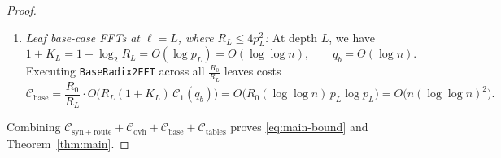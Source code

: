 \begin{proof}
\begin{itemize}[leftmargin=*]
\begin{enumerate}[label=(\alph*)]
    \[
      \frac{R_0}{R_\ell} \cdot O\!\left(\frac{R_\ell}{\tilde{W}_\ell} \cdot \tilde{W}_\ell p_{\ell+1} \log(\tilde{W}_\ell p_{\ell+1})\right) = O(R_0 p_{\ell+1} \log p_{\ell+1}) = O(n \log \log n)
    \]
    steps. Likewise, the $2 R_\ell$ pre-twists and post-twists and the at most $3 R_\ell$ real-by-complex solver products per node each multiply $O(p_{\ell+1})$-bit integers via $\texttt{Multiply}_1$ in $O(p_{\ell+1} \log p_{\ell+1})$ steps. Across all nodes at level $\ell$, those scalar products also cost $O(R_0 p_{\ell+1} \log p_{\ell+1}) = O(n \log \log n)$ steps. Summing over all $L = O(\log \log n)$ levels gives $\mathcal{C}_{\mathrm{ovh}} = O\bigl(n (\log \log n)^2\bigr)$.
    \item \emph{Leaf base-case FFTs at $\ell = L$, where $R_L \le 4 p_L^2$:} At depth $L$, we have
    \[
      1 + K_L = 1 + \log_2 R_L = O(\log p_L) = O(\log \log n), \qquad q_b = \Theta(\log n).
    \]
    Executing \texttt{BaseRadix2FFT} across all $\frac{R_0}{R_L}$ leaves costs
    \[
      \mathcal{C}_{\mathrm{base}} = \frac{R_0}{R_L} \cdot O\bigl(R_L (1 + K_L) \, \mathcal{C}_1(q_b)\bigr) = O\bigl(R_0 (\log \log n) \, p_L \log p_L\bigr) = O\bigl(n (\log \log n)^2\bigr).
    \]
  \end{enumerate}
\end{itemize}
Combining $\mathcal{C}_{\mathrm{syn+route}} + \mathcal{C}_{\mathrm{ovh}} + \mathcal{C}_{\mathrm{base}} + \mathcal{C}_{\mathrm{tables}}$ proves \eqref{eq:main-bound} and Theorem~\ref{thm:main}.
\end{proof}
